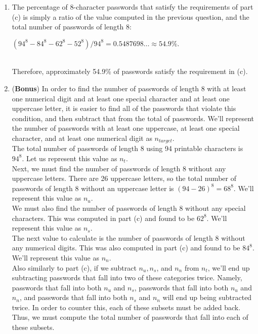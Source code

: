 \documentclass[11pt]{article}
\theoremstyle{definition}
\begin{document}
\begin{enumerate}
\begin{enumerate}
\item The percentage of 8-character passwords that satisfy the requirements of part (c) is simply a ratio of the value computed in the previous question, and the total number of passwords
of length 8:\\
\centerline{$(94^8 - 84^8 - 62^8 - 52^8)/94^8 = 0.5487698\ldots \approx 54.9\%.$}\\

Therefore, approximately 54.9\% of passwords satisfy the requirement in (c).\\

\item (\textbf{Bonus}) In order to find the number of passwords of length 8 with at least one numerical digit and at least one special character and at least one uppercase letter, it is easier to find
all of the passwords that violate this condition, and then subtract that from the total of passwords. We'll represent the number of passwords with at least one uppercase, at least one special character, and
at least one numerical digit as $n_{target}$.\\

The total number of passwords of length 8 using 94 printable characters is $94^8$. Let us represent this value as $n_{t}$.\\

Next, we must find the number of passwords of length 8 without any uppercase letters. There are 26 uppercase letters, so the total number of passwords of length 8 without an uppercase letter is $(94 - 26)^8 = 68^8$.
We'll represent this value as $n_{u}$.\\

We must also find the number of passwords of length 8 without any special characters. This was computed in part (c) and found to be $62^8$. We'll represent this value as $n_{s}$.\\

The next value to calculate is the number of passwords of length 8 without any numerical digits. This was also computed in part (c) and found to be $84^8$. We'll represent this value as $n_{n}$.\\

Also similarly to part (c), if we subtract $n_{u}, n_{s}$, and $n_{n}$ from $n_{t}$, we'll end up subtracting passwords that fall into two of these categories twice. Namely,
passwords that fall into both $n_{u}$ and $n_{s}$, passwords that fall into both $n_{u}$ and $n_{n}$, and passwords that fall into both $n_{s}$ and $n_{n}$ will end up
being subtracted twice. In order to counter this, each of these subsets must be added back. Thus, we must compute the total number of passwords that fall into each of these subsets.\\


\end{enumerate}
\end{enumerate}
\end{document}
